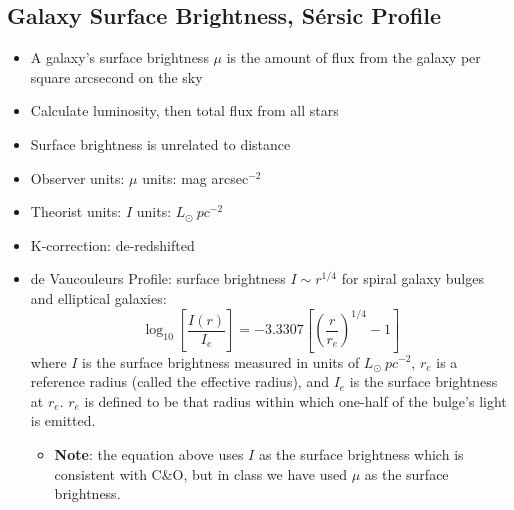\documentclass{book}
\begin{document}
\subsection{Galaxy Surface Brightness, Sérsic Profile}
\begin{itemize}
    \item A galaxy's surface brightness $\mu$ is the amount of flux from the galaxy per square arcsecond on the sky
    \item Calculate luminosity, then total flux from all stars
    \item Surface brightness is unrelated to distance
    \item Observer units: $\mu$ units: mag arcsec$^{-2}$
    \item Theorist units: $I$ units: $L_\odot\ pc^{-2}$
    \item K-correction: de-redshifted
    \item de Vaucouleurs Profile: surface brightness $I \sim r^{1/4}$ for spiral galaxy bulges and elliptical galaxies:
          \begin{equation*}
              \log_{10} \left[ \frac{I(r)}{I_e} \right] = -3.3307 \left[ \left( \frac{r}{r_e} \right)^{1/4} - 1 \right] \tag{C\&O 24.13}
          \end{equation*}
          where $I$ is the surface brightness measured in units of $L_\odot\ pc^{-2}$, $r_e$ is a reference radius (called the effective radius), and $I_e$ is the surface brightness at $r_e$. $r_e$ is defined to be that radius within which one-half of the bulge's light is emitted.
          \begin{itemize}
              \item \textbf{Note}: the equation above uses $I$ as the surface brightness which is consistent with C\&O, but in class we have used $\mu$ as the surface brightness.
          \end{itemize}
\end{itemize}
\end{document}
